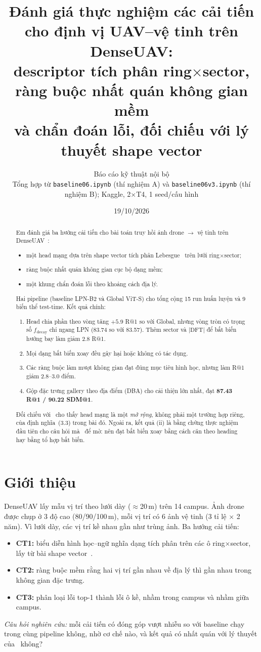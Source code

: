\documentclass[11pt,a4paper]{article}
\title{Đánh giá thực nghiệm các cải tiến cho định vị UAV--vệ tinh trên DenseUAV:\\
descriptor tích phân ring$\times$sector, ràng buộc nhất quán không gian mềm\\
và chẩn đoán lỗi, đối chiếu với lý thuyết shape vector}
\author{Báo cáo kỹ thuật nội bộ\\[2pt]
\small Tổng hợp từ \texttt{baseline06.ipynb} (thí nghiệm A) và \texttt{baseline06v3.ipynb} (thí nghiệm B);
Kaggle, 2$\times$T4, 1 seed/cấu hình}
\date{19/10/2026}
\begin{document}
\maketitle

\begin{abstract}
Em đánh giá ba hướng cải tiến cho bài toán truy hồi ảnh drone $\to$ vệ tinh trên DenseUAV~\cite{dai2024}:
\begin{itemize}
\item[(CT1)] một head mạng dựa trên shape vector tích phân Lebesgue~\cite{huu2026} trên lưới ring$\times$sector;
\item[(CT2)] ràng buộc nhất quán không gian cục bộ dạng mềm;
\item[(CT3)] một khung chẩn đoán lỗi theo khoảng cách địa lý.
\end{itemize}
Hai pipeline (baseline LPN-B2 và Global ViT-S) cho tổng cộng 15 run huấn luyện và 9 biến thể test-time. Kết quả chính:
\begin{enumerate}[label=(\roman*)]
\item Head chia phần theo vòng tăng $+5.9$ R@1 so với Global, nhưng vòng tròn có trọng số $f_{\mathrm{decay}}$ chỉ ngang LPN (83.74 so với 83.57). Thêm sector và $|\mathrm{DFT}|$ để bất biến hướng bay làm giảm 2.8 R@1.
\item Mọi dạng bất biến xoay đều gây hại hoặc không có tác dụng.
\item Các ràng buộc làm mượt không gian đạt đúng mục tiêu hình học, nhưng làm R@1 giảm 2.8--3.0 điểm.
\item Gộp đặc trưng gallery theo địa điểm (DBA) cho cải thiện lớn nhất, đạt \textbf{87.43 R@1 / 90.22 SDM@1}.
\end{enumerate}
Đối chiếu với~\cite{huu2026} cho thấy head mạng là một \emph{mở rộng}, không phải một trường hợp riêng, của định nghĩa~(3.3) trong bài đó. Ngoài ra, kết quả (ii) là bằng chứng thực nghiệm đầu tiên cho câu hỏi mà~\cite{huu2026} để mở: nên đạt bất biến xoay bằng cách căn theo heading hay bằng tổ hợp bất biến.
\end{abstract}

\section{Giới thiệu}
DenseUAV lấy mẫu vị trí theo lưới dày ($\approx$20\,m) trên 14 campus. Ảnh drone được chụp ở 3 độ cao (80/90/100\,m), mỗi vị trí có 6 ảnh vệ tinh (3 tỉ lệ $\times$ 2 năm). Vì lưới dày, các vị trí kề nhau gần như trùng ảnh. Ba hướng cải tiến:
\begin{itemize}
\item \textbf{CT1:} biểu diễn hình học--ngữ nghĩa dạng tích phân trên các ô ring$\times$sector, lấy từ bài shape vector~\cite{huu2026}.
\item \textbf{CT2:} ràng buộc mềm rằng hai vị trí gần nhau về địa lý thì gần nhau trong không gian đặc trưng.
\item \textbf{CT3:} phân loại lỗi top-1 thành lỗi ô kề, nhầm trong campus và nhầm giữa campus.
\end{itemize}
\emph{Câu hỏi nghiên cứu:} mỗi cải tiến có đóng góp vượt nhiễu so với baseline chạy trong cùng pipeline không, nhờ cơ chế nào, và kết quả có nhất quán với lý thuyết của~\cite{huu2026} không?
\end{document}
